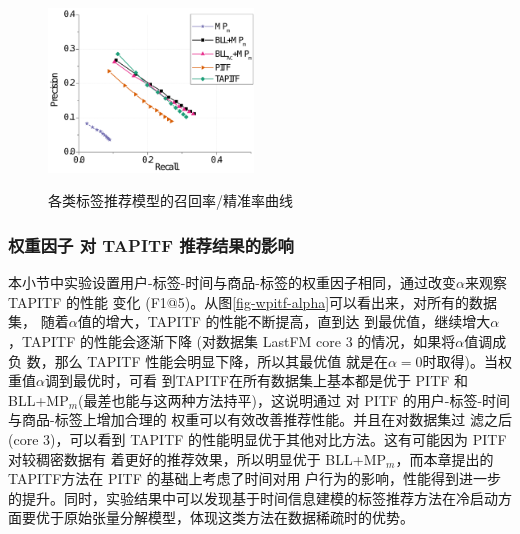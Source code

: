 \begin{figure}
{		\includegraphics[width=0.485\textwidth]{Fig/wpitf/prd1}}
	\hspace{0.0cm}
	\caption{各类标签推荐模型的召回率/精准率曲线}
	\label{fig-wpitf-pr}
\end{figure}

\subsubsection{权重因子 对 TAPITF 推荐结果的影响}
本小节中实验设置用户-标签-时间与商品-标签的权重因子相同，通过改变$\alpha$来观察 TAPITF 的性能 变化 (F1@5)。从图\ref{fig-wpitf-alpha}可以看出来，对所有的数据集， 随着$\alpha$值的增大，TAPITF 的性能不断提高，直到达 到最优值，继续增大$\alpha$，TAPITF 的性能会逐渐下降 (对数据集 LastFM core 3 的情况，如果将$\alpha$值调成负 数，那么 TAPITF 性能会明显下降，所以其最优值 就是在$\alpha=0$时取得)。当权重值$\alpha$调到最优时，可看
到TAPITF在所有数据集上基本都是优于 PITF 和 BLL+MP$_m$(最差也能与这两种方法持平)，这说明通过 对 PITF 的用户-标签-时间与商品-标签上增加合理的 权重可以有效改善推荐性能。并且在对数据集过 滤之后 (core 3)，可以看到 TAPITF 的性能明显优于其他对比方法。这有可能因为 PITF 对较稠密数据有 着更好的推荐效果，所以明显优于 BLL+MP$_m$，而本章提出的TAPITF方法在 PITF 的基础上考虑了时间对用 户行为的影响，性能得到进一步的提升。同时，实验结果中可以发现基于时间信息建模的标签推荐方法在冷启动方面要优于原始张量分解模型，体现这类方法在数据稀疏时的优势。

